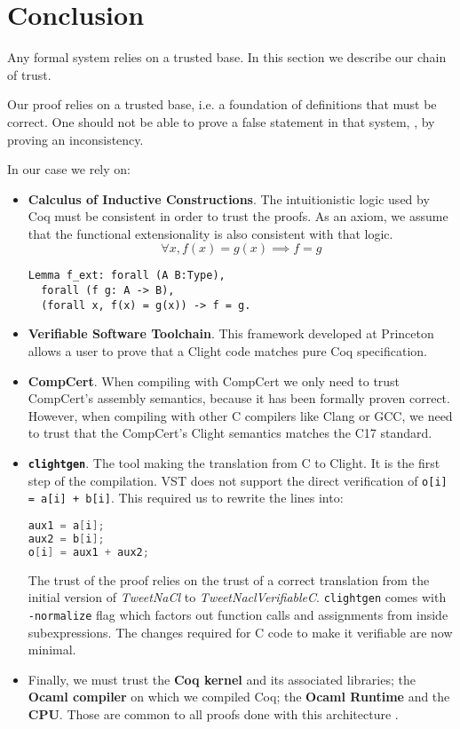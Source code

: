 \section{Conclusion}
\label{sec:Conclusion}

Any formal system relies on a trusted base. In this section we describe our
chain of trust.

Our proof relies on a trusted base, i.e. a foundation of definitions that must be
correct. One should not be able to prove a false statement in that system, \eg, by
proving an inconsistency.

In our case we rely on:
\begin{itemize}
  \item \textbf{Calculus of Inductive Constructions}. The intuitionistic logic
  used by Coq must be consistent in order to trust the proofs. As an axiom,
  we assume that the functional extensionality is also consistent with that logic.
  $$\forall x, f(x) = g(x) \implies f = g$$
\begin{lstlisting}[language=Coq]
Lemma f_ext: forall (A B:Type),
  forall (f g: A -> B),
  (forall x, f(x) = g(x)) -> f = g.
\end{lstlisting}

  \item \textbf{Verifiable Software Toolchain}. This framework developed at
  Princeton allows a user to prove that a Clight code matches pure Coq
  specification.

  \item \textbf{CompCert}.
  When compiling with CompCert we only need to trust CompCert's {assembly}
  semantics, because it has been formally proven correct.
  However, when compiling with other C compilers like Clang or GCC, we need to
  trust that the CompCert's Clight semantics matches the C17 standard.

  \item \textbf{\texttt{clightgen}}. The tool making the translation from {C} to
  {Clight}. It is the first step of the compilation.
  VST does not support the direct verification of \texttt{o[i] = a[i] + b[i]}.
  This required us to rewrite the lines into:
\begin{lstlisting}[language=C]
aux1 = a[i];
aux2 = b[i];
o[i] = aux1 + aux2;
\end{lstlisting}
  The trust of the proof relies on the trust of a correct translation from the
  initial version of \emph{TweetNaCl} to \emph{TweetNaclVerifiableC}.
  \texttt{clightgen} comes with \texttt{-normalize} flag which
  factors out function calls and assignments from inside subexpressions.
  The changes required for C code to make it verifiable are now minimal.

  \item Finally, we must trust the \textbf{Coq kernel} and its
  associated libraries; the \textbf{Ocaml compiler} on which we compiled Coq;
  the \textbf{Ocaml Runtime} and the \textbf{CPU}. Those are common to all proofs
  done with this architecture \cite{2015-Appel,coq-faq}.
\end{itemize}

